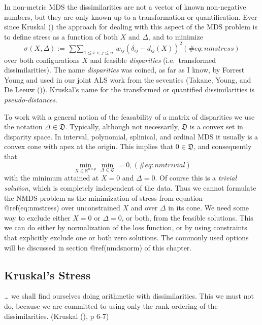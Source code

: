 \documentclass[
  12pt,
  letterpaper,
  DIV=11,
  numbers=noendperiod]{scrreprt}
\theoremstyle{remark}
\begin{document}
In non-metric MDS the dissimilarities are not a vector of known
non-negative numbers, but they are only known up to a transformation or
quantification. Ever since Kruskal ()
the approach for dealing with this aspect of the MDS problem is to
define stress as a function of both \(X\) and \(\Delta\), and to
minimize \begin{equation}
\sigma(X,\Delta):=\mathop{\sum\sum}_{1\leq i<j\leq n}w_{ij}(\delta_{ij}-d_{ij}(X))^2
(\#eq:nmstress)
\end{equation} over both configurations \(X\) and feasible
\emph{disparities} (i.e.~transformed dissimilarities). The name
\emph{disparities} was coined, as far as I know, by Forrest Young and
used in our joint ALS work from the seventies (Takane, Young, and De
Leeuw ()). Kruskal's name
for the transformed or quantified dissimilarities is
\emph{pseudo-distances}.

To work with a general notion of the feasability of a matrix of
disparities we use the notation \(\Delta\in\mathfrak{D}\). Typically,
although not necessarily, \(\mathfrak{D}\) is a convex set in disparity
space. In interval, polynomial, splinical, and ordinal MDS it usually is
a convex cone with apex at the origin. This implies that
\(0\in\mathfrak{D}\), and consequently that \begin{equation}
\min_{X\in\mathbb{R}^{n\times p}}\min_{\Delta\in\mathfrak{D}}=0,
(\#eq:nmtrivial)
\end{equation} with the minimum attained at \(X=0\) and \(\Delta=0\). Of
course this is a \emph{trivial solution}, which is completely
independent of the data. Thus we cannot formulate the NMDS problem as
the minimization of stress from equation @ref(eq:nmstress) over
unconstrained \(X\) and over \(\Delta\) in its cone. We need some way to
exclude either \(X=0\) or \(\Delta=0\), or both, from the feasible
solutions. This we can do either by normalization of the loss function,
or by using constraints that explicitly exclude one or both zero
solutions. The commonly used options will be discussed in section
@ref(nmdsnorm) of this chapter.

\subsection{Kruskal's Stress}\label{kruskals-stress-1}

\ldots{} we shall find ourselves doing arithmetic with dissimilarities.
This we must not do, because we are committed to using only the rank
ordering of the dissimilarities. (Kruskal
(), p 6-7)
\end{document}
